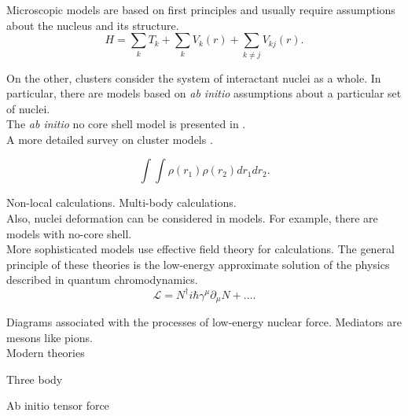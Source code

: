\documentclass[openany]{book}
\begin{document}
Microscopic models are based on first principles and usually require assumptions about the nucleus and its structure. \\ 

\begin{equation} \label{eq:micro_hamiltonian}
	H = \sum_{k} T_k + \sum_{k} V_k (r) + \sum_{k \neq j} V_{kj}(r).
\end{equation}

On the other, clusters consider the system of interactant nuclei as a whole. In particular, there are models based on \textit{ab initio} assumptions about a particular set of nuclei.  \\



The \textit{ab initio} no core shell model is presented in \cite{barrett_navratil_vary_2013}. \\

A more detailed survey on cluster models \cite{beck_2012}.

\begin{equation}  \label{eq:micro_folding}
	\int \int \rho(r_1) \rho(r_2) dr_1 dr_2. 
\end{equation}

Non-local calculations. Multi-body calculations. \\

Also, nuclei deformation can be considered in models. For example, there are models with no-core shell. \\

More sophisticated models use effective field theory for calculations. The general principle of these theories is the low-energy approximate solution of the physics described in quantum chromodynamics. \\

\begin{equation} \label{eq:micro_lagrangian_nucleons}
	\mathcal{L} = N^{\dagger}i\hbar\gamma^\mu\partial_\mu N + ... .
\end{equation}

Diagrams associated with the processes of low-energy nuclear force. Mediators are mesons like pions. \\

Modern theories \cite{marcucci_nollett_schiavilla_wiringa_2006}

Three body \cite{grigorenko_danilin_efros_shulgina_zhukov_1998}

Ab initio \cite{neff_feldmeier_langanke_2011}
\cite{navratil_quaglioni_hupin_romero-redondo_calci_2016}
\cite{navratil_bertulani_caurier_2006}
\cite{atkinson_navratil_hupin_kravvaris_quaglioni_2022}
tensor force \cite{arai_aoyama_suzuki_descouvemont_baye_2013}
\end{document}
